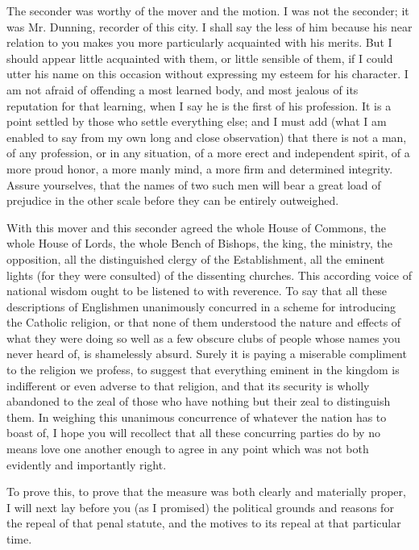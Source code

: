 The seconder was worthy of the mover and the motion. I was not the seconder; it was Mr. Dunning, recorder of this city. I shall say the less of him because his near relation to you makes you more particularly acquainted with his merits. But I should appear little acquainted with them, or little sensible of them, if I could utter his name on this occasion without expressing my esteem for his character. I am not afraid of offending a most learned body, and most jealous of its reputation for that learning, when I say he is the first of his profession. It is a point settled by those who settle everything else; and I must add (what I am enabled to say from my own long and close observation) that there is not a man, of any profession, or in any situation, of a more erect and independent spirit, of a more proud honor, a more manly mind, a more firm and determined integrity. Assure yourselves, that the names of two such men will bear a great load of prejudice in the other scale before they can be entirely outweighed.

With this mover and this seconder agreed the whole House of Commons, the whole House of Lords, the whole Bench of Bishops, the king, the ministry, the opposition, all the distinguished clergy of the Establishment, all the eminent lights (for they were consulted) of the dissenting churches. This according voice of national wisdom ought to be listened to with reverence. To say that all these descriptions of Englishmen unanimously concurred in a scheme for introducing the Catholic religion, or that none of them understood the nature and effects of what they were doing so well as a few obscure clubs of people whose names you never heard of, is shamelessly absurd. Surely it is paying a miserable compliment to the religion we profess, to suggest that everything eminent in the kingdom is indifferent or even adverse to that religion, and that its security is wholly abandoned to the zeal of those who have nothing but their zeal to distinguish them. In weighing this unanimous concurrence of whatever the nation has to boast of, I hope you will recollect that all these concurring parties do by no means love one another enough to agree in any point which was not both evidently and importantly right.

To prove this, to prove that the measure was both clearly and materially proper, I will next lay before you (as I promised) the political grounds and reasons for the repeal of that penal statute, and the motives to its repeal at that particular time.

